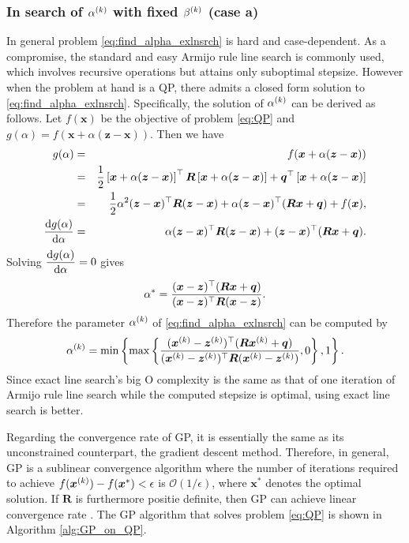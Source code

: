 \subsubsection{In search of $\alpha^{(k)}$ with fixed $\beta^{(k)}$ (case a)}
In general problem \eqref{eq:find_alpha_exlnsrch} is hard and case-dependent.
As a compromise, the standard and easy Armijo rule line search is commonly used,
which involves recursive operations but attains only suboptimal stepsize.
However when the problem at hand is a QP, there admits a closed form solution
to \eqref{eq:find_alpha_exlnsrch}.
Specifically, the solution of $\alpha^{(k)}$ can be derived as follows.
Let $f(\bm x)$ be the objective of problem \eqref{eq:QP} and
$g(\alpha) = f(\bm x + \alpha(\bm z-\bm x))$.
Then we have
\begin{eqnarray}
    g(\alpha)
    & = &
    f(\bm x + \alpha(\bm z-\bm x)) \nonumber \\
    & = &
    \displaystyle
    \frac{1}{2} \left[ \bm x + \alpha(\bm z-\bm x) \right]^\top
    \bm R       \left[ \bm x + \alpha(\bm z-\bm x) \right] +
    \bm q^\top    \left[ \bm x + \alpha(\bm z-\bm x) \right] \nonumber \\
    & = &
    \displaystyle
    \frac{1}{2} \alpha^2 (\bm z-\bm x)^\top \bm R (\bm z-\bm x) +
    \alpha (\bm z-\bm x)^\top (\bm R\bm x+\bm q) + f(\bm x), \\
    \frac{{\rm d} g(\alpha)}{{\rm d} \alpha}
    & = &
    \alpha (\bm z-\bm x)^\top \bm R (\bm z-\bm x) +
    (\bm z-\bm x)^\top(\bm R \bm x + \bm q).
\end{eqnarray}
Solving $\displaystyle \frac{{\rm d} g(\alpha)}{{\rm d} \alpha} = 0$ gives
\begin{equation}
    \alpha^* = \frac{(\bm x-\bm z)^\top(\bm R\bm x+\bm q)}
                    {(\bm x-\bm z)^\top\bm R(\bm x-\bm z)}.
\end{equation}
Therefore the parameter $\alpha^{(k)}$ of \eqref{eq:find_alpha_exlnsrch} can
be computed by
\begin{equation}
    \alpha^{(k)} =
    \min\left \{ \max\left \{
    \frac{(\bm x^{(k)}-\bm z^{(k)})^\top(\bm R\bm x^{(k)}+\bm q)}
    {(\bm x^{(k)}-\bm z^{(k)})^\top\bm R(\bm x^{(k)}-\bm z^{(k)})} ,
    0 \right \} , 1 \right \}.
    \label{eq:alpha_update}
\end{equation}
Since exact line search's big O complexity is the same as that of one iteration
of Armijo rule line search while the computed stepsize is optimal, using exact
line search is better.

Regarding the convergence rate of GP, it is essentially the same as its
unconstrained counterpart, \ie the gradient descent method.
Therefore, in general, GP is a sublinear convergence algorithm where the
number of iterations required to achieve
$f(\bm x^{(k)}) - f(\bm x^*) < \epsilon$ is $\mathcal O(1 / \epsilon)$,
where $\bm x^*$ denotes the optimal solution.
If $\bm R$ is furthermore positie definite, then GP can achieve linear
convergence rate \cite{NONLINEAR_PRGM}.
The GP algorithm that solves problem \eqref{eq:QP} is shown in Algorithm
\ref{alg:GP_on_QP}.

